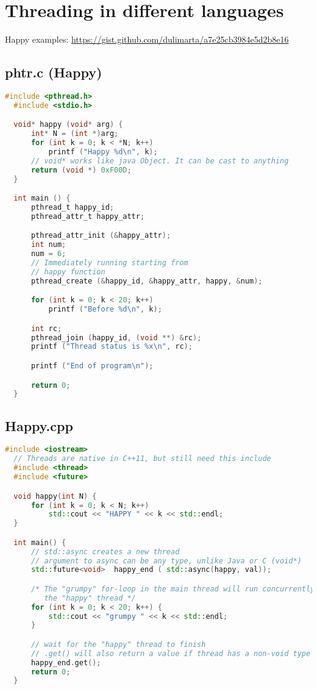 \documentclass[11pt]{article}
\begin{document}
\section*{Threading in different languages}
Happy examples: \url{https://gist.github.com/dulimarta/a7e25cb3984e5d2b8e16}
\subsection*{phtr.c (Happy)}
\begin{lstlisting}[language=c]
  #include <pthread.h>
  #include <stdio.h>

  void* happy (void* arg) {
      int* N = (int *)arg;
      for (int k = 0; k < *N; k++)
          printf ("Happy %d\n", k);
      // void* works like java Object. It can be cast to anything
      return (void *) 0xF00D;
  }

  int main () {
      pthread_t happy_id;
      pthread_attr_t happy_attr;

      pthread_attr_init (&happy_attr);
      int num;
      num = 6;
      // Immediately running starting from
      // happy function
      pthread_create (&happy_id, &happy_attr, happy, &num);

      for (int k = 0; k < 20; k++)
          printf ("Before %d\n", k);

      int rc;
      pthread_join (happy_id, (void **) &rc);
      printf ("Thread status is %x\n", rc);

      printf ("End of program\n");

      return 0;
  }
\end{lstlisting}
\subsection*{Happy.cpp}
\begin{lstlisting}[language=c++]
  #include <iostream>
  // Threads are native in C++11, but still need this include
  #include <thread>
  #include <future>

  void happy(int N) {
      for (int k = 0; k < N; k++)
          std::cout << "HAPPY " << k << std::endl;
  }

  int main() {
      // std::async creates a new thread
      // argument to async can be any type, unlike Java or C (void*)
      std::future<void>  happy_end ( std::async(happy, val));

      /* The "grumpy" for-loop in the main thread will run concurrently with
         the "happy" thread */
      for (int k = 0; k < 20; k++) {
          std::cout << "grumpy " << k << std::endl;
      }

      // wait for the "happy" thread to finish
      // .get() will also return a value if thread has a non-void type
      happy_end.get();
      return 0;
  }
\end{lstlisting}
\end{document}
